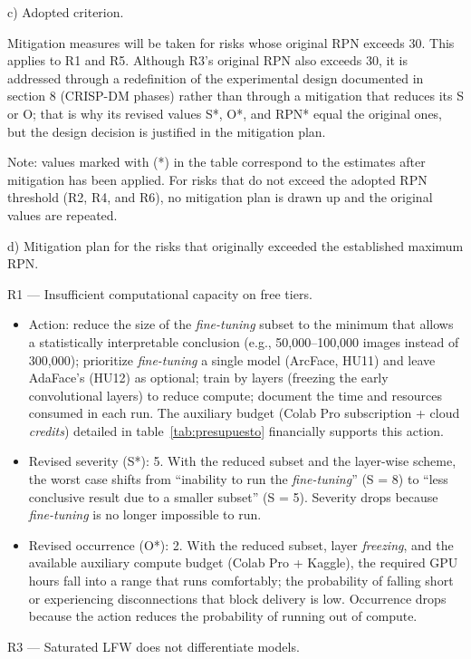 \documentclass[
  11pt, %
]{charter}
\begin{document}
c) Adopted criterion.

Mitigation measures will be taken for risks whose original RPN exceeds 30. This applies to R1 and R5. Although R3's original RPN also exceeds 30, it is addressed through a redefinition of the experimental design documented in section 8 (CRISP-DM phases) rather than through a mitigation that reduces its S or O; that is why its revised values S*, O*, and RPN* equal the original ones, but the design decision is justified in the mitigation plan.

Note: values marked with (*) in the table correspond to the estimates after mitigation has been applied. For risks that do not exceed the adopted RPN threshold (R2, R4, and R6), no mitigation plan is drawn up and the original values are repeated.

d) Mitigation plan for the risks that originally exceeded the established maximum RPN.

R1 --- Insufficient computational capacity on free tiers.

\begin{itemize}
\item Action: reduce the size of the \textit{fine-tuning} subset to the minimum that allows a statistically interpretable conclusion (e.g., 50,000--100,000 images instead of 300,000); prioritize \textit{fine-tuning} a single model (ArcFace, HU11) and leave AdaFace's (HU12) as optional; train by layers (freezing the early convolutional layers) to reduce compute; document the time and resources consumed in each run. The auxiliary budget (Colab Pro subscription + cloud \textit{credits}) detailed in table~\ref{tab:presupuesto} financially supports this action.
\item Revised severity (S*): 5. With the reduced subset and the layer-wise scheme, the worst case shifts from ``inability to run the \textit{fine-tuning}'' (S = 8) to ``less conclusive result due to a smaller subset'' (S = 5). Severity drops because \textit{fine-tuning} is no longer impossible to run.
\item Revised occurrence (O*): 2. With the reduced subset, layer \textit{freezing}, and the available auxiliary compute budget (Colab Pro + Kaggle), the required GPU hours fall into a range that runs comfortably; the probability of falling short or experiencing disconnections that block delivery is low. Occurrence drops because the action reduces the probability of running out of compute.
\end{itemize}

R3 --- Saturated LFW does not differentiate models.
\end{document}
